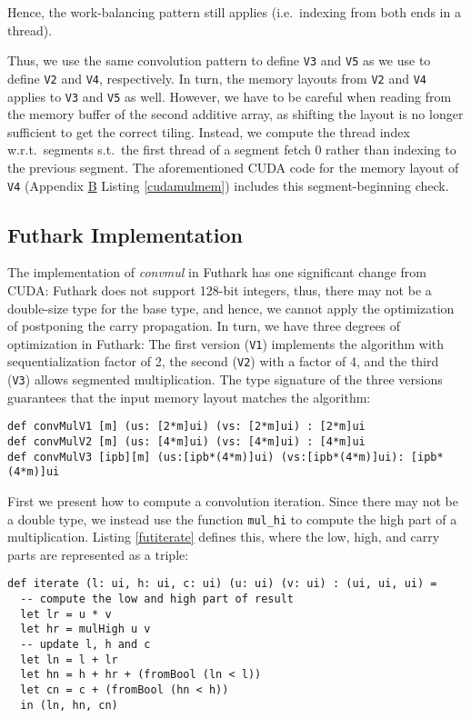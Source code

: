 Hence, the work-balancing pattern still applies (i.e.\ indexing from both ends
in a thread).

Thus, we use the same convolution pattern to define \texttt{V3} and \texttt{V5}
as we use to define \texttt{V2} and \texttt{V4}, respectively. In turn, the
memory layouts from \texttt{V2} and \texttt{V4} applies to \texttt{V3} and
\texttt{V5} as well. However, we have to be careful when reading from the memory
buffer of the second additive array, as shifting the layout is no longer
sufficient to get the correct tiling. Instead, we compute the thread index
w.r.t.\ segments s.t.\ the first thread of a segment fetch $0$ rather than
indexing to the previous segment. The aforementioned CUDA code for the memory
layout of \texttt{V4} (Appendix \hyperref[app:B]{B} Listing \ref{cudamulmem})
includes this segment-beginning check.

\subsection{Futhark Implementation}
\label{subsec:mulfut}

The implementation of \textit{convmul} in Futhark has one significant change
from CUDA: Futhark does not support 128-bit integers, thus, there may not be a
double-size type for the base type, and hence, we cannot apply the optimization
of postponing the carry propagation. In turn, we have three degrees of
optimization in Futhark: The first version (\texttt{V1}) implements the
algorithm with sequentialization factor of 2, the second (\texttt{V2}) with a
factor of 4, and the third (\texttt{V3}) allows segmented multiplication.  The
type signature of the three versions guarantees that the input memory layout
matches the algorithm:
\begin{lstlisting}[language=futhark,frame=none,numbers=none]
def convMulV1 [m] (us: [2*m]ui) (vs: [2*m]ui) : [2*m]ui
def convMulV2 [m] (us: [4*m]ui) (vs: [4*m]ui) : [4*m]ui
def convMulV3 [ipb][m] (us:[ipb*(4*m)]ui) (vs:[ipb*(4*m)]ui): [ipb*(4*m)]ui
\end{lstlisting}

First we present how to compute a convolution iteration. Since there may not be
a double type, we instead use the function \texttt{mul\_hi} to compute the high
part of a multiplication. Listing \ref{futiterate} defines this, where the low,
high, and carry parts are represented as a triple:
\begin{lstlisting}[language=futhark,caption={\footnotesize Futhark function to compute a convolution iteration from file \texttt{mul.fut}.},label={futiterate},firstnumber=16]
def iterate (l: ui, h: ui, c: ui) (u: ui) (v: ui) : (ui, ui, ui) =
  -- compute the low and high part of result
  let lr = u * v
  let hr = mulHigh u v
  -- update l, h and c
  let ln = l + lr
  let hn = h + hr + (fromBool (ln < l))
  let cn = c + (fromBool (hn < h))
  in (ln, hn, cn)
\end{lstlisting}

